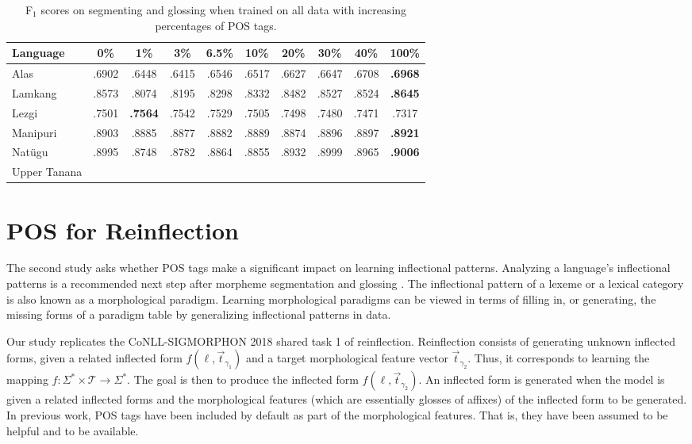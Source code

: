 \begin{table}[htb]
    \centering
    \begin{tabular}{l|ccccccccc}
       \textbf{Language} & \textbf{0\%} & \textbf{1\%} & \textbf{3\%} & \textbf{6.5\%} & \textbf{10\%} & \textbf{20\%} & \textbf{30\%} & \textbf{40\%} & \textbf{100\%}  \\
       \hline
       Alas  & .6902 & .6448  & .6415 & .6546 & .6517 & .6627 & .6647 & .6708 & \textbf{.6968} \\
       \hline
       Lamkang & .8573 & .8074 & .8195 & .8298 & .8332 & .8482 & .8527 & .8524 & \textbf{.8645}  \\
       \hline
       Lezgi  & .7501 & \textbf{.7564} & .7542 & .7529 & .7505 & .7498 & .7480  & .7471 & .7317 \\
       \hline
       Manipuri & .8903 & .8885 & .8877 & .8882 & .8889 & .8874 & .8896 & .8897 & \textbf{.8921} \\
       \hline
       Nat\"ugu & .8995 & .8748 & .8782 & .8864 & .8855 & .8932 & .8999 & .8965 & \textbf{.9006} \\
       \hline
       Upper Tanana &  &  &  &  &  &  &  &  \\
    \end{tabular}
    \caption[Results with More POS Tags]{F$_1$ scores on segmenting and glossing when trained on all data with increasing percentages of POS tags.}
    \label{tab:POSSGpsp}
\end{table}



\section{POS for Reinflection}
\label{sec:inflection}

The second study asks whether POS tags make a significant impact on learning inflectional patterns. Analyzing a language's inflectional patterns is a recommended next step after morpheme segmentation and glossing \citep{bird_machine_2012}. The inflectional pattern of a lexeme or a lexical category is also known as a morphological paradigm. Learning morphological paradigms can be viewed in terms of filling in, or generating, the missing forms of a paradigm table by generalizing inflectional patterns in data. 

Our study replicates the CoNLL-SIGMORPHON 2018 shared task 1 of reinflection. Reinflection consists of generating unknown inflected forms, given a related inflected form 
$f(\ell, \vec{t}_{\gamma_1})$ and a target morphological feature vector $\vec{t}_{\gamma_2}$. Thus, it corresponds to learning the mapping $f : \Sigma^* \times \mathcal{T} \to \Sigma^*$. The goal is then to produce the inflected form $f(\ell, \vec{t}_{\gamma_2})$. 
An inflected form is generated when the model is given a related inflected forms and the morphological features (which are essentially glosses of affixes) of the inflected form to be generated. 
In previous work, POS tags have been included by default as part of the morphological features. That is, they have been assumed to be helpful and to be available.


